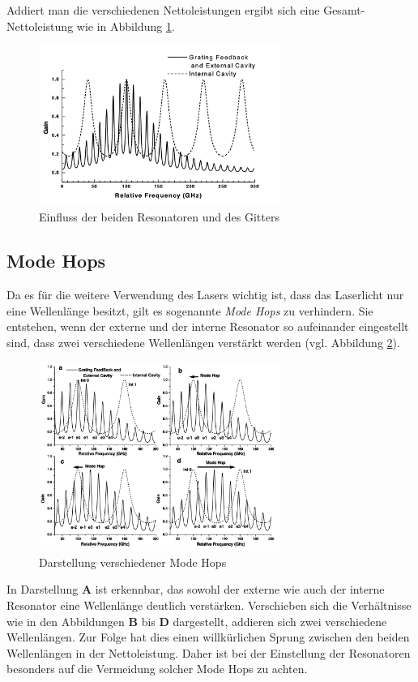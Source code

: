 Addiert man die verschiedenen Nettoleistungen ergibt sich eine Gesamt-Nettoleistung wie in Abbildung \ref{fig:netto}.
\begin{figure}
    \centering
    \includegraphics[width=0.7\textwidth]{abb/netto.png}
    \caption{Einfluss der beiden Resonatoren und des Gitters \cite{laser}}
    \label{fig:netto}
\end{figure}

\subsection{Mode Hops}
Da es für die weitere Verwendung des Lasers wichtig ist,
dass das Laserlicht nur eine Wellenlänge besitzt,
gilt es sogenannte \textit{Mode Hops} zu verhindern.
Sie entstehen, 
wenn der externe und der interne Resonator so aufeinander eingestellt sind,
dass zwei verschiedene Wellenlängen verstärkt werden (vgl. Abbildung \ref{fig:modehops}).
\begin{figure}
    \centering
    \includegraphics[width=0.7\textwidth]{abb/modehops.png}
    \caption{Darstellung verschiedener Mode Hops \cite{laser}}
    \label{fig:modehops}
\end{figure}
In Darstellung \textbf{A} ist erkennbar, das sowohl der externe wie auch der interne Resonator eine Wellenlänge deutlich verstärken.
Verschieben sich die Verhältnisse
wie in den Abbildungen \textbf{B} bis \textbf{D} dargestellt,
addieren sich zwei verschiedene Wellenlängen.
Zur Folge hat dies einen willkürlichen Sprung zwischen den beiden Wellenlängen in der Nettoleistung.
Daher ist bei der Einstellung der Resonatoren besonders auf die Vermeidung solcher Mode Hops zu achten.



